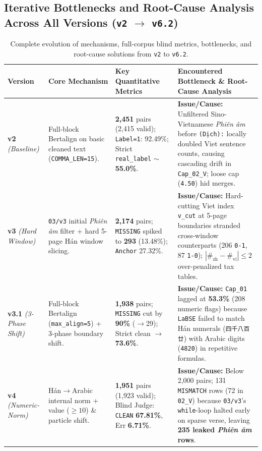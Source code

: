\documentclass[a4paper]{article}
\begin{document}
\subsection{Iterative Bottlenecks and Root-Cause Analysis Across All Versions (\texorpdfstring{\texttt{v2} $\to$ \texttt{v6.2}}{v2 to v6.2})}
\begin{table}[!htb]
\centering
\caption{Complete evolution of mechanisms, full-corpus blind metrics, bottlenecks, and root-cause solutions from \texttt{v2} to \texttt{v6.2}.}
\label{tab:versions}
\scriptsize
\setlength{\tabcolsep}{3.4pt}
\renewcommand{\arraystretch}{1.07}
\begin{tabularx}{\textwidth}{@{}L{1.80cm} L{3.40cm} L{3.35cm} Y@{}}
\toprule
\textbf{Version} & \textbf{Core Mechanism} & \textbf{Key Quantitative Metrics} & \textbf{Encountered Bottleneck \& Root-Cause Analysis} \\
\midrule
\textbf{v2} \newline \textit{(Baseline)} & Full-block Bertalign on basic cleaned text (\texttt{COMMA\_LEN=15}). & \textbf{2,451} pairs (2,415 valid); \texttt{Label=1}: 92.49\%; Strict \texttt{real\_label} $\sim$\textbf{55.0\%}. & \textbf{Issue/Cause:} Unfiltered Sino-Vietnamese \textit{Phiên âm} before \texttt{(Dịch):} locally doubled Viet sentence counts, causing cascading drift in \texttt{Cap\_02\_V}; loose cap (\texttt{4.50}) hid merges. \\
\addlinespace[1.1pt]
\textbf{v3} \newline \textit{(Hard Window)} & \texttt{03/v3} initial \textit{Phiên âm} filter + hard 5-page Hán window slicing. & \textbf{2,174} pairs; \texttt{MISSING} spiked to \textbf{293} (13.48\%); \texttt{Anchor} 27.32\%. & \textbf{Issue/Cause:} Hard-cutting Viet index \texttt{v\_cut} at 5-page boundaries stranded cross-window counterparts (206 \texttt{0-1}, 87 \texttt{1-0}); $|\#_{\text{zh}}-\#_{\text{vi}}|\le 2$ over-penalized tax tables. \\
\addlinespace[1.1pt]
\textbf{v3.1} \newline \textit{(3-Phase Shift)} & Full-block Bertalign (\texttt{max\_align=5}) + 3-phase boundary shift. & \textbf{1,938} pairs; \texttt{MISSING} cut by \textbf{90\%} ($\to$29); Strict clean $\to$\textbf{73.6\%}. & \textbf{Issue/Cause:} \texttt{Cap\_01} lagged at \textbf{53.3\%} (208 numeric flags) because \texttt{LaBSE} failed to match Hán numerals (\texttt{四千八百廿}) with Arabic digits (\texttt{4820}) in repetitive formulas. \\
\addlinespace[1.1pt]
\textbf{v4} \newline \textit{(Numeric-Norm)} & Hán$\to$Arabic internal norm + value ($\ge 10$) \& particle shift. & \textbf{1,951} pairs (1,923 valid); Blind Judge: \texttt{CLEAN} \textbf{67.81\%}, Err \textbf{6.71\%}. & \textbf{Issue/Cause:} Below 2,000 pairs; 131 \texttt{MISMATCH} rows (72 in \texttt{02\_V}) because \texttt{03/v3}'s \texttt{while}-loop halted early on sparse verse, leaving \textbf{235 leaked \textit{Phiên âm} rows}. \\

\end{tabularx}
\end{table}
\end{document}
